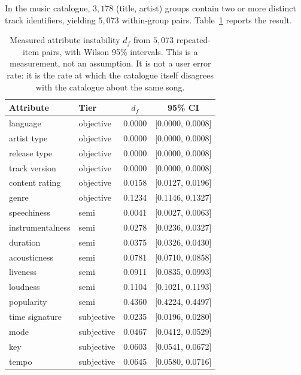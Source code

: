 In the music catalogue, $3{,}178$ (title, artist) groups contain two or more
distinct track identifiers, yielding $5{,}073$ within-group pairs.
Table~\ref{tab:discordance} reports the result.

\begin{table}[t]
\caption{Measured attribute instability $d_f$ from $5{,}073$ repeated-item
pairs, with Wilson 95\% intervals. This is a measurement, not an assumption.
It is not a user error rate: it is the rate at which the catalogue itself
disagrees with the catalogue about the same song.}
\label{tab:discordance}
\centering
\footnotesize
\begin{tabular}{@{}llcc@{}}
\toprule
\textbf{Attribute} & \textbf{Tier} & \textbf{$d_f$} & \textbf{95\% CI} \\
\midrule
language                & objective & 0.0000 & [0.0000, 0.0008] \\
artist type             & objective & 0.0000 & [0.0000, 0.0008] \\
release type            & objective & 0.0000 & [0.0000, 0.0008] \\
track version           & objective & 0.0000 & [0.0000, 0.0008] \\
content rating          & objective & 0.0158 & [0.0127, 0.0196] \\
genre                   & objective & 0.1234 & [0.1146, 0.1327] \\
\midrule
speechiness             & semi & 0.0041 & [0.0027, 0.0063] \\
instrumentalness        & semi & 0.0278 & [0.0236, 0.0327] \\
duration                & semi & 0.0375 & [0.0326, 0.0430] \\
acousticness            & semi & 0.0781 & [0.0710, 0.0858] \\
liveness                & semi & 0.0911 & [0.0835, 0.0993] \\
loudness                & semi & 0.1104 & [0.1021, 0.1193] \\
popularity              & semi & 0.4360 & [0.4224, 0.4497] \\
\midrule
time signature          & subjective & 0.0235 & [0.0196, 0.0280] \\
mode                    & subjective & 0.0467 & [0.0412, 0.0529] \\
key                     & subjective & 0.0603 & [0.0541, 0.0672] \\
tempo                   & subjective & 0.0645 & [0.0580, 0.0716] \\

\end{tabular}
\end{table}
